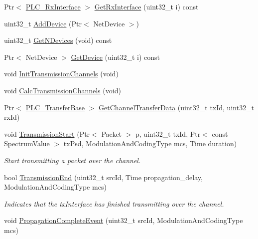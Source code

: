 \begin{DoxyCompactItemize}
\item 
\-Ptr$<$ \hyperlink{classns3_1_1PLC__RxInterface}{\-P\-L\-C\-\_\-\-Rx\-Interface} $>$ \hyperlink{classns3_1_1PLC__Channel_aa9fe1d783e2d3662649835c99232f04d}{\-Get\-Rx\-Interface} (uint32\-\_\-t i) const 
\item 
uint32\-\_\-t \hyperlink{classns3_1_1PLC__Channel_ad89f6779ad4976cd5acfbe072996eff6}{\-Add\-Device} (\-Ptr$<$ \-Net\-Device $>$)
\item 
uint32\-\_\-t \hyperlink{classns3_1_1PLC__Channel_abf943700252f5244e10ba042f142ee6f}{\-Get\-N\-Devices} (void) const 
\item 
\-Ptr$<$ \-Net\-Device $>$ \hyperlink{classns3_1_1PLC__Channel_a3b85c19d252573c3efc1578613b22f9d}{\-Get\-Device} (uint32\-\_\-t i) const 
\item 
void \hyperlink{classns3_1_1PLC__Channel_a9210af0d915d96817f77e21000deb5a5}{\-Init\-Transmission\-Channels} (void)
\item 
void \hyperlink{classns3_1_1PLC__Channel_a2bb68af9c30a3d0c4f7a264c4e90ddab}{\-Calc\-Transmission\-Channels} (void)
\item 
\-Ptr$<$ \hyperlink{classns3_1_1PLC__ValueBase}{\-P\-L\-C\-\_\-\-Transfer\-Base} $>$ \hyperlink{classns3_1_1PLC__Channel_ae0ccd3520dbb21ed05cb006f817a89c7}{\-Get\-Channel\-Transfer\-Data} (uint32\-\_\-t tx\-Id, uint32\-\_\-t rx\-Id)
\item 
void \hyperlink{classns3_1_1PLC__Channel_ab228999eedede7397bca8f26d2877fba}{\-Transmission\-Start} (\-Ptr$<$ \-Packet $>$ p, uint32\-\_\-t tx\-Id, \-Ptr$<$ const \-Spectrum\-Value $>$ tx\-Psd, \-Modulation\-And\-Coding\-Type mcs, \-Time duration)
\begin{DoxyCompactList}\small\item\em \-Start transmitting a packet over the channel. \end{DoxyCompactList}\item 
bool \hyperlink{classns3_1_1PLC__Channel_a55062b28eb83414f99f9941d093ee02d}{\-Transmission\-End} (uint32\-\_\-t src\-Id, \-Time propagation\-\_\-delay, \-Modulation\-And\-Coding\-Type mcs)
\begin{DoxyCompactList}\small\item\em \-Indicates that the tx\-Interface has finished transmitting over the channel. \end{DoxyCompactList}\item 
void \hyperlink{classns3_1_1PLC__Channel_a7a8d3f9a2f2a603db996402b8ffa7efc}{\-Propagation\-Complete\-Event} (uint32\-\_\-t src\-Id, \-Modulation\-And\-Coding\-Type mcs)

\end{DoxyCompactItemize}
